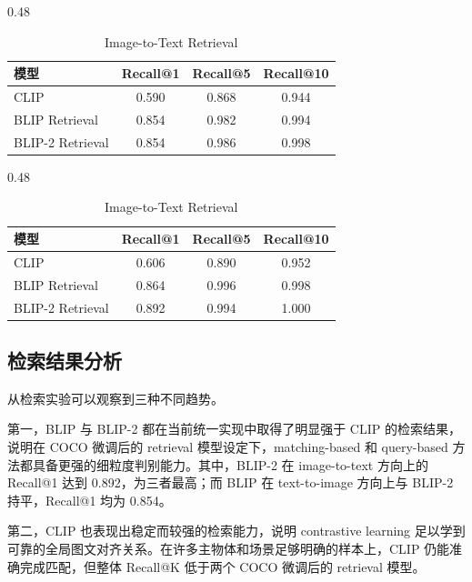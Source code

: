 \documentclass[UTF8,a4paper,10pt]{ctexart}
\begin{document}
\begin{table}[H]
    \centering
    \caption{图文检索结果}
    \begin{subtable}[t]{0.48\textwidth}
        \centering
        \caption{Text-to-Image Retrieval}
        \small
        \begin{tabular}{lccc}
            \toprule
            模型 & Recall@1 & Recall@5 & Recall@10 \\
            \midrule
            CLIP & 0.590 & 0.868 & 0.944 \\
            BLIP Retrieval & 0.854 & 0.982 & 0.994 \\
            BLIP-2 Retrieval & 0.854 & 0.986 & 0.998 \\
            \bottomrule
        \end{tabular}
    \end{subtable}
    \hfill
    \begin{subtable}[t]{0.48\textwidth}
        \centering
        \caption{Image-to-Text Retrieval}
        \small
        \begin{tabular}{lccc}
            \toprule
            模型 & Recall@1 & Recall@5 & Recall@10 \\
            \midrule
            CLIP & 0.606 & 0.890 & 0.952 \\
            BLIP Retrieval & 0.864 & 0.996 & 0.998 \\
            BLIP-2 Retrieval & 0.892 & 0.994 & 1.000 \\
            \bottomrule
        \end{tabular}
    \end{subtable}
\end{table}

\subsection{检索结果分析}

从检索实验可以观察到三种不同趋势。

第一，BLIP 与 BLIP-2 都在当前统一实现中取得了明显强于 CLIP 的检索结果，说明在 COCO 微调后的 retrieval 模型设定下，matching-based 和 query-based 方法都具备更强的细粒度判别能力。其中，BLIP-2 在 image-to-text 方向上的 Recall@1 达到 0.892，为三者最高；而 BLIP 在 text-to-image 方向上与 BLIP-2 持平，Recall@1 均为 0.854。

第二，CLIP 也表现出稳定而较强的检索能力，说明 contrastive learning 足以学到可靠的全局图文对齐关系。在许多主物体和场景足够明确的样本上，CLIP 仍能准确完成匹配，但整体 Recall@K 低于两个 COCO 微调后的 retrieval 模型。
\end{document}
